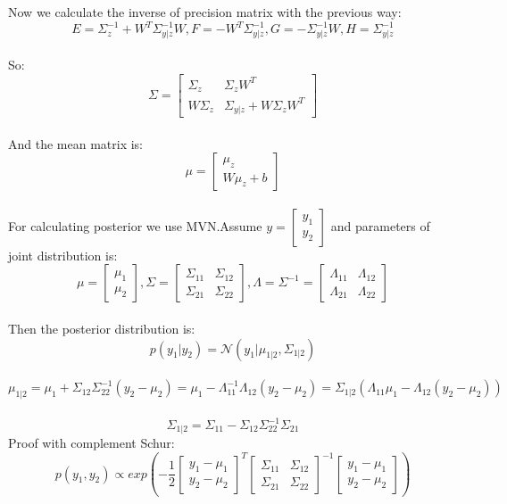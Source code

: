 \documentclass[12pt]{article}
\begin{document}
\begin{qsolve}[Question 1]
	Now we calculate the inverse of precision matrix with the previous way:\\
	$$E=\Sigma_z^{-1}+W^T\Sigma_{y|z}^{-1}W,F=-W^T\Sigma_{y|z}^{-1},G=-\Sigma_{y|z}^{-1}W,H=\Sigma_{y|z}^{-1}$$\\
	So:\\
	$$\Sigma=\begin{bmatrix} \Sigma_z&\Sigma_zW^T\\W\Sigma_z&\Sigma_{y|z}+W\Sigma_zW^T\end{bmatrix}$$\\
	And the mean matrix is:
	$$\mu=\begin{bmatrix} \mu_z\\W\mu_z+b\end{bmatrix}$$\\
	For calculating posterior we use MVN.Assume $y=\begin{bmatrix} y_1\\y_2\end{bmatrix}$ and parameters of joint distribution is:\\
	$$\mu=\begin{bmatrix} \mu_1\\\mu_2\end{bmatrix},\Sigma=\begin{bmatrix} \Sigma_{11}&\Sigma_{12}\\\Sigma_{21}&\Sigma_{22}\end{bmatrix},\Lambda=\Sigma^{-1}=\begin{bmatrix} \Lambda_{11}&\Lambda_{12}\\\Lambda_{21}&\Lambda_{22}\end{bmatrix}$$\\
	\splitqsolve
	Then the posterior distribution is:
	$$p(y_1|y_2)=\mathcal{N}(y_1|\mu_{1|2},\Sigma_{1|2})$$\\
	$$\mu_{1|2}=\mu_1+\Sigma_{12}\Sigma_{22}^{-1}(y_2-\mu_2)=\mu_1-\Lambda_{11}^{-1}\Lambda_{12}(y_2-\mu_2)=\Sigma_{1|2}(\Lambda_{11}\mu_1-\Lambda_{12}(y_2-\mu_2))$$\\
	$$\Sigma_{1|2}=\Sigma_{11}-\Sigma_{12}\Sigma_{22}^{-1}\Sigma_{21}$$
	Proof with complement Schur:
	$$p(y_1,y_2)\propto exp(-\frac{1}{2}\begin{bmatrix} y_1-\mu_1\\y_2-\mu_2\end{bmatrix}^T\begin{bmatrix} \Sigma_{11}&\Sigma_{12}\\\Sigma_{21}&\Sigma_{22}\end{bmatrix}^{-1}\begin{bmatrix} y_1-\mu_1\\y_2-\mu_2\end{bmatrix})$$\\

\end{qsolve}
\end{document}
